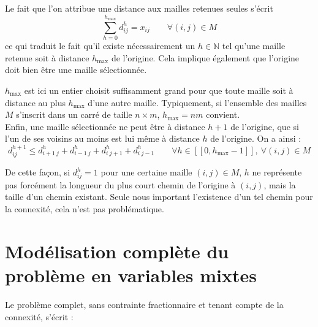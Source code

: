 \documentclass[a4paper,11pt]{article}
\begin{document}
Le fait que l'on attribue une distance aux mailles retenues seules s'écrit
\begin{equation}
\sum_{h=0}^{h_{\max}} d^h_{ij} = x_{ij} \qquad \forall (i,j) \in M
\end{equation}
ce qui traduit le fait qu'il existe nécessairement un $h \in \mathbb{N}$ tel qu'une maille retenue soit à distance $h_{\max}$ de l'origine. Cela implique également que l'origine doit bien être une maille sélectionnée.

$h_{\max}$ est ici un entier choisit suffisamment grand pour que toute maille soit à distance au plus $h_{\max}$ d'une autre maille. Typiquement, si l'ensemble des mailles $M$ s'inscrit dans un carré de taille $n\times m$, $h_{\max} = n m$ convient.\\


Enfin, une maille sélectionnée ne peut être à distance $h+1$ de l'origine, que si l'un de ses voisins au moins est lui même à distance $h$ de l'origine. On a ainsi :
\begin{equation}
d^{h+1}_{ij} \le d^h_{i+1~j} + d^h_{i-1~j} + d^h_{i~j+1} + d^h_{i~j-1} \qquad \forall h \in [\![ 0, h_{\max}-1 ]\!],~ \forall (i,j) \in M
\end{equation}



De cette façon, si $d^h_{ij} = 1$ pour une certaine maille $(i,j) \in M$, $h$ ne représente pas forcément la longueur du plus court chemin de l'origine à $(i,j)$, mais la taille d'un chemin existant. Seule nous important l'existence d'un tel chemin pour la connexité, cela n'est pas problématique.


\section{Modélisation complète du problème en variables mixtes}



Le problème complet, sans contrainte fractionnaire et tenant compte de la connexité, s'écrit :
\end{document}
